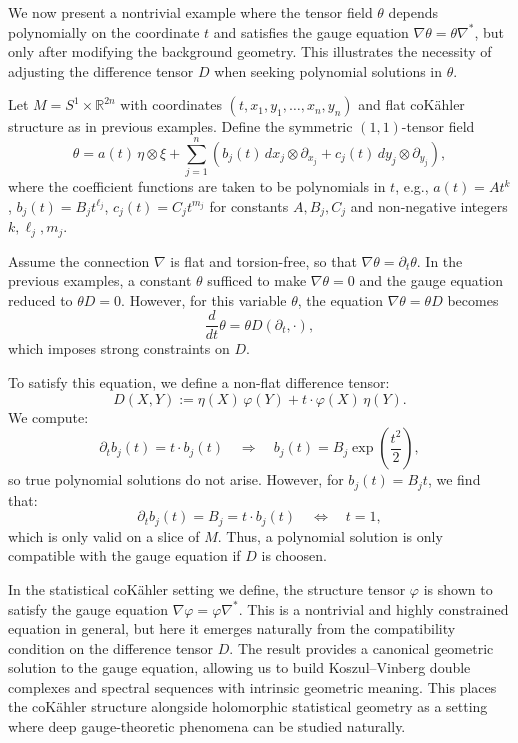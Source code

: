 \begin{ex}

We now present a nontrivial example where the tensor field $\theta$ depends polynomially on the coordinate $t$ and satisfies the gauge equation $\nabla \theta = \theta \nabla^*$, but only after modifying the background geometry. This illustrates the necessity of adjusting the difference tensor $D$ when seeking polynomial solutions in $\theta$.

Let $M = S^1 \times \mathbb{R}^{2n}$ with coordinates $(t, x_1, y_1, \ldots, x_n, y_n)$ and flat coKähler structure as in previous examples. Define the symmetric $(1,1)$-tensor field
\[
\theta = a(t)\, \eta \otimes \xi + \sum_{j=1}^n \left( b_j(t)\, dx_j \otimes \partial_{x_j} + c_j(t)\, dy_j \otimes \partial_{y_j} \right),
\]
where the coefficient functions are taken to be polynomials in $t$, e.g., $a(t) = A t^k$, $b_j(t) = B_j t^{\ell_j}$, $c_j(t) = C_j t^{m_j}$ for constants $A, B_j, C_j$ and non-negative integers $k, \ell_j, m_j$.

Assume the connection $\nabla$ is flat and torsion-free, so that $\nabla \theta = \partial_t \theta$. In the previous examples, a constant $\theta$ sufficed to make $\nabla \theta = 0$ and the gauge equation reduced to $\theta D = 0$. However, for this variable $\theta$, the equation $\nabla \theta = \theta D$ becomes
\[
\frac{d}{dt} \theta = \theta D(\partial_t, \cdot),
\]
which imposes strong constraints on $D$.

To satisfy this equation, we define a non-flat difference tensor:
\[
D(X,Y) := \eta(X)\, \varphi(Y) + t \cdot \varphi(X)\, \eta(Y).
\]
We compute:
\[
\partial_t b_j(t) = t \cdot b_j(t) \quad \Rightarrow \quad b_j(t) = B_j \exp\left(\frac{t^2}{2}\right),
\]
so true polynomial solutions do not arise. However, for $b_j(t) = B_j t$, we find that:
\[
\partial_t b_j(t) = B_j = t \cdot b_j(t) \quad \Leftrightarrow \quad t = 1,
\]
which is only valid on a slice of $M$. Thus, a  polynomial solution is only compatible with the gauge equation if $D$ is choosen. 
\end{ex}

In the statistical coKähler setting we define, the structure tensor $\varphi$ is shown to satisfy the gauge equation $\nabla \varphi = \varphi \nabla^*$. This is a nontrivial and highly constrained equation in general, but here it emerges naturally from the compatibility condition on the difference tensor $D$. The result provides a canonical geometric solution to the gauge equation, allowing us to build Koszul–Vinberg double complexes and spectral sequences with intrinsic geometric meaning. This places the coKähler structure alongside holomorphic statistical geometry as a setting where deep gauge-theoretic phenomena can be studied naturally.

